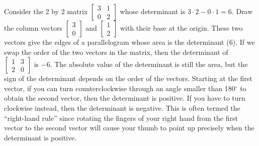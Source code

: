     
Consider the 2 by 2 matrix $\begin{bmatrix}3&1\\0&2\end{bmatrix}$ whose determinant is $3\cdot 2-0\cdot 1=6$. Draw the column vectors $\begin{bmatrix}3\\0\end{bmatrix}$ and $\begin{bmatrix}1\\2\end{bmatrix}$ with their base at the origin. 
These two vectors give the edges of a parallelogram whose area is the determinant ($6$).  If we swap the order of the two vectors in the matrix, then the determinant of $\begin{bmatrix}1&3\\2&0\end{bmatrix}$ is $-6$.  The absolute value of the determinant is still the area, but the sign of the determinant depends on the order of the vectors. Starting at the first vector, if you can turn counterclockwise through an angle smaller than 180$^\circ$ to obtain the second vector, then the determinant is positive.  If you have to turn clockwise instead, then the determinant is negative.  This is often termed the ``right-hand rule'' since rotating the fingers of your right hand from the first vector to the second vector will cause your thumb to point up precisely when the determinant is positive.

